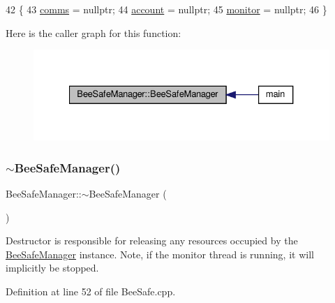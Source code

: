 \begin{DoxyCode}
42 \{
43     \hyperlink{class_bee_safe_manager_a80b19afbb679d08be14d67a45447f9e1}{comms} = \textcolor{keyword}{nullptr};
44     \hyperlink{class_bee_safe_manager_a52bc9bc8c1ea9608b83d603b142443b0}{account} = \textcolor{keyword}{nullptr};
45     \hyperlink{class_bee_safe_manager_a3b885b4fb364228c914095f2e670f9af}{monitor} = \textcolor{keyword}{nullptr};
46 \}
\end{DoxyCode}
Here is the caller graph for this function\+:
\nopagebreak
\begin{figure}[H]
\begin{center}
\leavevmode
\includegraphics[width=327pt]{d5/d75/class_bee_safe_manager_a4a897d6317bdc548fb235d0cdb2877b1_icgraph}
\end{center}
\end{figure}
\mbox{\label{class_bee_safe_manager_ac99fb148bcac3aa3f51e96fdf7bc0c1b}} 
\subsubsection{\texorpdfstring{$\sim$\+Bee\+Safe\+Manager()}{~BeeSafeManager()}}
{\footnotesize\ttfamily Bee\+Safe\+Manager\+::$\sim$\+Bee\+Safe\+Manager (\begin{DoxyParamCaption}{ }\end{DoxyParamCaption})}

Destructor is responsible for releasing any resources occupied by the \hyperlink{class_bee_safe_manager}{Bee\+Safe\+Manager} instance. Note, if the monitor thread is running, it will implicitly be stopped. 

Definition at line 52 of file Bee\+Safe.\+cpp.


